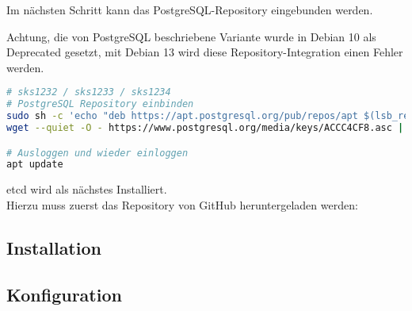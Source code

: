 \begin{flushleft}
    Im nächsten Schritt kann das PostgreSQL-Repository eingebunden werden.\\
    \begin{warning}
    Achtung, die von PostgreSQL beschriebene Variante wurde in Debian 10 als Deprecated gesetzt,
    mit Debian 13 wird diese Repository-Integration einen Fehler werden.
    \end{warning}    \lstset{style=gra_codestyle}
\begin{lstlisting}[language=bash, caption=Patroni - PostgreSQL einbinden,captionpos=b,label={lst:patroni-include-repository},breaklines=true]
# sks1232 / sks1233 / sks1234
# PostgreSQL Repository einbinden
sudo sh -c 'echo "deb https://apt.postgresql.org/pub/repos/apt $(lsb_release -cs)-pgdg main" > /etc/apt/sources.list.d/pgdg.list'
wget --quiet -O - https://www.postgresql.org/media/keys/ACCC4CF8.asc | sudo apt-key add -

# Ausloggen und wieder einloggen
apt update
\end{lstlisting}
\end{flushleft}
\begin{flushleft}
    \gls{etcd} wird als nächstes Installiert.\\
    Hierzu muss zuerst das Repository von \Gls{GitHub} heruntergeladen werden:
\end{flushleft}
\begin{flushleft}
\end{flushleft}
\begin{flushleft}
\end{flushleft}
\begin{flushleft}
\end{flushleft}
\begin{flushleft}
    \subsection{Installation}
\end{flushleft}
\begin{flushleft}
\end{flushleft}
\begin{flushleft}
    \subsection{Konfiguration}
\end{flushleft}
\begin{flushleft}
\end{flushleft}